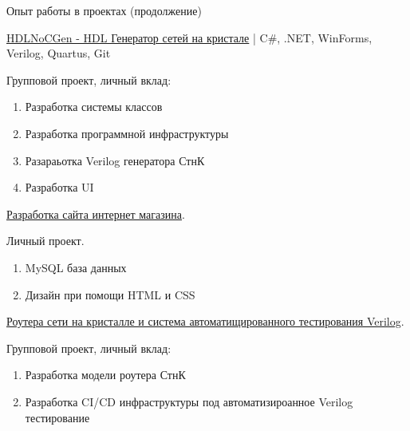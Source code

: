 \begin{rubric}{Опыт работы в проектах (продолжение)}

\entry*[2023-2024]\href{https://drive.google.com/drive/folders/1UaEPuE1M2vIYpUWMorWQyj1NkYkr4I3a}{HDLNoCGen - HDL Генератор сетей на кристале} | C\#, .NET, WinForms, Verilog, Quartus, Git

Групповой проект, личный вклад:

\begin{enumerate}
  \item Разработка системы классов
  \item Разработка программной инфраструктуры
  \item Разараьотка Verilog генератора СтнК
  \item Разработка UI
\end{enumerate}

%

\entry*[2023] \href{https://github.com/Elgrush/GoldFinger}{Разработка сайта интернет магазина}.

Личный проект.

\begin{enumerate}
  \item MySQL база данных
  \item Дизайн при помощи HTML и CSS
\end{enumerate}

\entry*[2026] \href{https://github.com/apoj-inc/AXI-NoC-with-built-in-PMUs}{Роутера сети на кристалле и система автоматищированного тестирования Verilog}.

Групповой проект, личный вклад:

\begin{enumerate}
  \item Разработка модели роутера СтнК
  \item Разработка CI/CD инфраструктуры под автоматизироанное Verilog тестирование
\end{enumerate}



\end{rubric}
